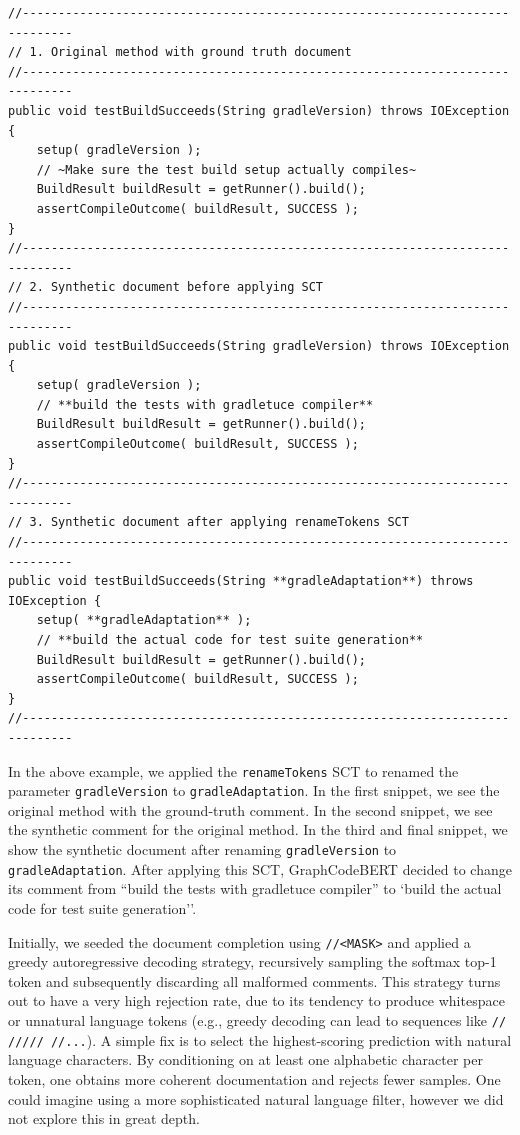\documentclass[sigconf,review,anonymous]{acmart}
\begin{document}
  \begin{lstlisting}[basicstyle=\tiny\ttfamily]
//-----------------------------------------------------------------------------
// 1. Original method with ground truth document
//-----------------------------------------------------------------------------
public void testBuildSucceeds(String gradleVersion) throws IOException {
    setup( gradleVersion );
    // ~Make sure the test build setup actually compiles~
    BuildResult buildResult = getRunner().build();
    assertCompileOutcome( buildResult, SUCCESS );
}
//-----------------------------------------------------------------------------
// 2. Synthetic document before applying SCT
//-----------------------------------------------------------------------------
public void testBuildSucceeds(String gradleVersion) throws IOException {
    setup( gradleVersion );
    // **build the tests with gradletuce compiler**
    BuildResult buildResult = getRunner().build();
    assertCompileOutcome( buildResult, SUCCESS );
}
//-----------------------------------------------------------------------------
// 3. Synthetic document after applying renameTokens SCT
//-----------------------------------------------------------------------------
public void testBuildSucceeds(String **gradleAdaptation**) throws IOException {
    setup( **gradleAdaptation** );
    // **build the actual code for test suite generation**
    BuildResult buildResult = getRunner().build();
    assertCompileOutcome( buildResult, SUCCESS );
}
//-----------------------------------------------------------------------------
  \end{lstlisting}

  In the above example, we applied the \lstinline|renameTokens| SCT to renamed the parameter \lstinline|gradleVersion| to \lstinline|gradleAdaptation|. In the first snippet, we see the original method with the ground-truth comment. In the second snippet, we see the synthetic comment for the original method. In the third and final snippet, we show the synthetic document after renaming \lstinline|gradleVersion| to \lstinline|gradleAdaptation|. After applying this SCT, GraphCodeBERT decided to change its comment from ``build the tests with gradletuce compiler'' to `build the actual code for test suite generation''.

  Initially, we seeded the document completion using \texttt{//<MASK>} and applied a greedy autoregressive decoding strategy, recursively sampling the softmax top-1 token and subsequently discarding all malformed comments. This strategy turns out to have a very high rejection rate, due to its tendency to produce whitespace or unnatural language tokens (e.g., greedy decoding can lead to sequences like \texttt{// ///// //...}). A simple fix is to select the highest-scoring prediction with natural language characters. By conditioning on at least one alphabetic character per token, one obtains more coherent documentation and rejects fewer samples. One could imagine using a more sophisticated natural language filter, however we did not explore this in great depth.
\end{document}
